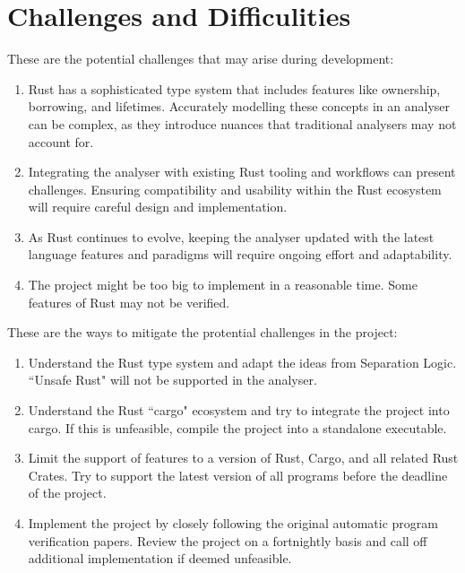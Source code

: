 \documentclass[11pt,a4paper]{article}
\begin{document}
\section{Challenges and Difficulities}
These are the potential challenges that may arise during development:
\begin{enumerate}
      \item Rust has a sophisticated type system that includes features like ownership, borrowing, and lifetimes. Accurately modelling these concepts in an analyser can be complex, as they introduce nuances that traditional analysers may not account for.
      \item Integrating the analyser with existing Rust tooling and workflows can present challenges. Ensuring compatibility and usability within the Rust ecosystem will require careful design and implementation.
      \item As Rust continues to evolve, keeping the analyser updated with the latest language features and paradigms will require ongoing effort and adaptability.
      \item The project might be too big to implement in a reasonable time. Some features of Rust may not be verified.
\end{enumerate}
\vspace{60pt}
These are the ways to mitigate the protential challenges in the project: 
\begin{enumerate}
      \item Understand the Rust type system and adapt the ideas from Separation Logic. ``Unsafe Rust" will not be supported in the analyser.
      \item Understand the Rust ``cargo" ecosystem and try to integrate the project into cargo. If this is unfeasible, compile the project into a standalone executable.
      \item Limit the support of features to a version of Rust, Cargo, and all related Rust Crates. Try to support the latest version of all programs before the deadline of the project.
      \item Implement the project by closely following the original automatic program verification papers. Review the project on a fortnightly basis and call off additional implementation if deemed unfeasible.
\end{enumerate}


\pagebreak
\end{document}

